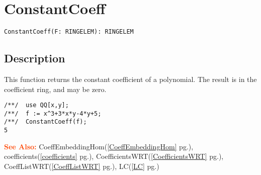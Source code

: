 \documentclass[a4paper]{mybook}
\newenvironment{command}{}{} %
\newcommand\SeeAlso{\par\textcolor{OrangeRed}{\textbf{\large See Also: }}}
\begin{document}
\section{ConstantCoeff}
\label{ConstantCoeff}
\begin{command} %


\begin{Verbatim}[label=syntax, rulecolor=\color{MidnightBlue},
frame=single]
ConstantCoeff(F: RINGELEM): RINGELEM
\end{Verbatim}


\subsection*{Description}

This function returns the constant coefficient of a polynomial.
The result is in the coefficient ring, and may be zero.
\begin{Verbatim}[label=example, rulecolor=\color{PineGreen}, frame=single]
/**/  use QQ[x,y];
/**/  f := x^3+3*x*y-4*y+5;
/**/  ConstantCoeff(f);
5
\end{Verbatim}


\SeeAlso %
  CoeffEmbeddingHom(\ref{CoeffEmbeddingHom} pg.\pageref{CoeffEmbeddingHom}), 
    coefficients(\ref{coefficients} pg.\pageref{coefficients}), 
    CoefficientsWRT(\ref{CoefficientsWRT} pg.\pageref{CoefficientsWRT}), 
    CoeffListWRT(\ref{CoeffListWRT} pg.\pageref{CoeffListWRT}), 
    LC(\ref{LC} pg.\pageref{LC})
\end{command} %
\end{document}
